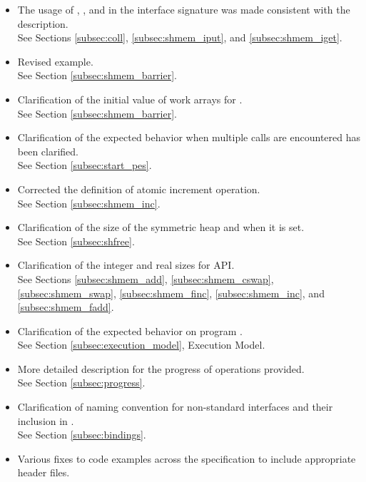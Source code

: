 \begin{itemize}
\item The usage of , , and  in the interface signature 
      was made consistent with the description.\\See Sections \ref{subsec:coll}, \ref{subsec:shmem_iput}, and \ref{subsec:shmem_iget}.
\item Revised  example.\\See Section \ref{subsec:shmem_barrier}. 
\item Clarification of the initial value of  work arrays for .\\ See Section \ref{subsec:shmem_barrier}. 
\item Clarification of the expected behavior when multiple  calls are encountered has been clarified.\\See Section \ref{subsec:start_pes}.
\item Corrected the definition of atomic increment operation.\\See Section \ref{subsec:shmem_inc}. 
\item Clarification of the size of the symmetric heap and when it is set.\\See Section \ref{subsec:shfree}.
\item Clarification of the integer and real sizes for \Fortran{} \ac{API}.\\See Sections \ref{subsec:shmem_add}, \ref{subsec:shmem_cswap}, \ref{subsec:shmem_swap}, \ref{subsec:shmem_finc}, \ref{subsec:shmem_inc}, and \ref{subsec:shmem_fadd}. 
\item Clarification of the expected behavior on program .\\ See Section \ref{subsec:execution_model}, Execution Model. 
\item More detailed description for the progress of \openshmem operations provided.\\ See Section \ref{subsec:progress}. 
\item Clarification of naming convention for non-standard interfaces and their inclusion in .\\ See Section \ref{subsec:bindings}. 
\item Various fixes to \openshmem code examples across the specification to include appropriate header files. 

\end{itemize}

